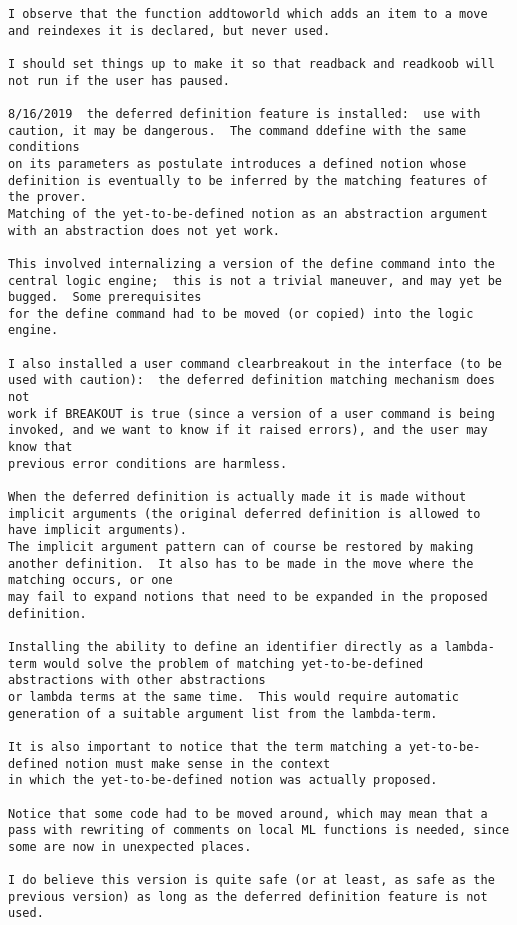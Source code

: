 \documentclass{article}
\begin{document}
{\begin{verbatim}
I observe that the function addtoworld which adds an item to a move and reindexes it is declared, but never used.

I should set things up to make it so that readback and readkoob will not run if the user has paused.

8/16/2019  the deferred definition feature is installed:  use with caution, it may be dangerous.  The command ddefine with the same conditions
on its parameters as postulate introduces a defined notion whose definition is eventually to be inferred by the matching features of the prover.
Matching of the yet-to-be-defined notion as an abstraction argument with an abstraction does not yet work.

This involved internalizing a version of the define command into the central logic engine;  this is not a trivial maneuver, and may yet be bugged.  Some prerequisites
for the define command had to be moved (or copied) into the logic engine.

I also installed a user command clearbreakout in the interface (to be used with caution):  the deferred definition matching mechanism does not
work if BREAKOUT is true (since a version of a user command is being invoked, and we want to know if it raised errors), and the user may know that
previous error conditions are harmless.

When the deferred definition is actually made it is made without implicit arguments (the original deferred definition is allowed to have implicit arguments).
The implicit argument pattern can of course be restored by making another definition.  It also has to be made in the move where the matching occurs, or one
may fail to expand notions that need to be expanded in the proposed definition.

Installing the ability to define an identifier directly as a lambda-term would solve the problem of matching yet-to-be-defined abstractions with other abstractions
or lambda terms at the same time.  This would require automatic generation of a suitable argument list from the lambda-term.

It is also important to notice that the term matching a yet-to-be-defined notion must make sense in the context
in which the yet-to-be-defined notion was actually proposed.

Notice that some code had to be moved around, which may mean that a pass with rewriting of comments on local ML functions is needed, since
some are now in unexpected places.

I do believe this version is quite safe (or at least, as safe as the previous version) as long as the deferred definition feature is not used.


\end{verbatim}}
\end{document}
